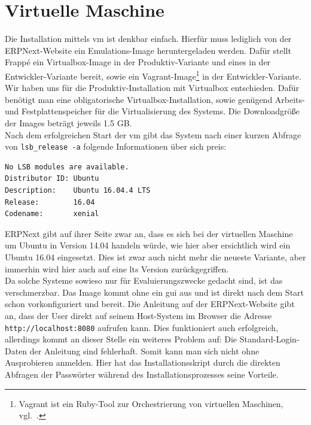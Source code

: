 \section{Virtuelle Maschine}
Die Installation mittels \gls{vm} ist denkbar einfach. Hierfür muss lediglich von der ERPNext-Website ein Emulations-Image heruntergeladen werden. Dafür stellt Frappé ein Virtualbox-Image in der Produktiv-Variante und eines in der Entwickler-Variante bereit, sowie ein Vagrant-Image\footnote{Vagrant ist ein Ruby-Tool zur Orchestrierung von virtuellen Maschinen, vgl.\ \cite{Vagrant}.} in der Entwickler-Variante.\\
Wir haben uns für die Produktiv-Installation mit Virtualbox entschieden.
Dafür benötigt man eine obligatorische Virtualbox-Installation, sowie genügend Arbeits- und Festplattenspeicher für die Virtualisierung des Systems. Die Downloadgröße der Images beträgt jeweils 1.5 GB.\\ Nach dem erfolgreichen Start der \gls{vm} gibt das System nach einer kurzen Abfrage von \texttt{lsb\_release -a} folgende Informationen über sich preis:
\begin{verbatim}
No LSB modules are available.
Distributor ID: Ubuntu
Description:    Ubuntu 16.04.4 LTS
Release:        16.04
Codename:       xenial
\end{verbatim}
ERPNext gibt auf ihrer Seite zwar an, dass es sich bei der virtuellen Maschine um Ubuntu in Version 14.04 handeln würde, wie hier aber ersichtlich wird ein Ubuntu 16.04 eingesetzt. Dies ist zwar auch nicht mehr die neueste Variante, aber immerhin wird hier auch auf eine \gls{lts} Version zurückgegriffen.\\
Da solche Systeme sowieso nur für Evaluierungszwecke gedacht sind, ist das verschmerzbar.
Das Image kommt ohne ein \gls{gui} aus und ist direkt nach dem Start schon vorkonfiguriert und bereit. Die Anleitung auf der ERPNext-Website gibt an, dass der User direkt auf seinem Host-System im Browser die Adresse \texttt{http://localhost:8080} aufrufen kann. Dies funktioniert auch erfolgreich, allerdings kommt an dieser Stelle ein weiteres Problem auf: Die Standard-Login-Daten der Anleitung sind fehlerhaft. Somit kann man sich nicht ohne Ausprobieren anmelden. Hier hat das Installationsskript durch die direkten Abfragen der Passwörter während des Installationsprozesses seine Vorteile.

